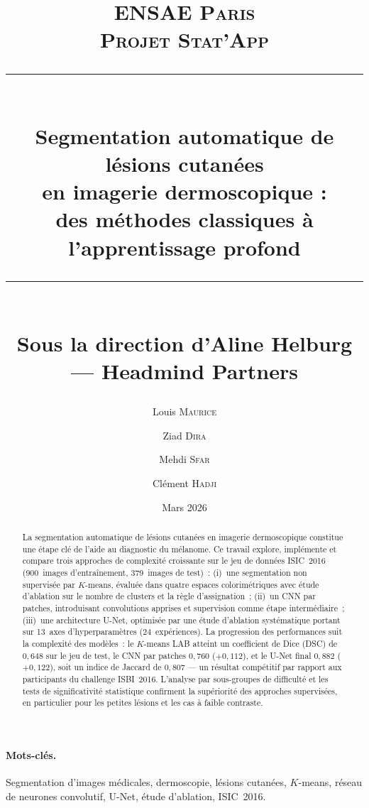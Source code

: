 \documentclass[12pt,a4paper]{article}
\title{%
    \vspace{-1cm}
    \textsc{ENSAE Paris} \\[0.3cm]
    \textsc{Projet Stat'App} \\[0.8cm]
    \rule{\linewidth}{0.5mm} \\[0.4cm]
    {\LARGE \textbf{Segmentation automatique de lésions cutanées \\[0.2cm]
    en imagerie dermoscopique : \\[0.2cm]
    des méthodes classiques à l'apprentissage profond}} \\[0.3cm]
    \rule{\linewidth}{0.5mm} \\[0.6cm]
    {\large Sous la direction d'Aline Helburg --- Headmind Partners}
}
\author{
    Louis \textsc{Maurice} \and
    Ziad \textsc{Dira} \and
    Mehdi \textsc{Sfar} \and
    Clément \textsc{Hadji}
}
\date{Mars 2026}
\begin{document}
\maketitle
\thispagestyle{empty}
\newpage

\begin{abstract}
La segmentation automatique de lésions cutanées en imagerie dermoscopique constitue une étape clé de l'aide au diagnostic du mélanome. Ce travail explore, implémente et compare trois approches de complexité croissante sur le jeu de données ISIC~2016 (900~images d'entraînement, 379~images de test)~: (i)~une segmentation non supervisée par $K$-means, évaluée dans quatre espaces colorimétriques avec étude d'ablation sur le nombre de clusters et la règle d'assignation~; (ii)~un CNN par patches, introduisant convolutions apprises et supervision comme étape intermédiaire~; (iii)~une architecture U-Net, optimisée par une étude d'ablation systématique portant sur 13~axes d'hyperparamètres (24~expériences). La progression des performances suit la complexité des modèles~: le $K$-means LAB atteint un coefficient de Dice (DSC) de $0{,}648$ sur le jeu de test, le CNN par patches $0{,}760$ ($+0{,}112$), et le U-Net final $0{,}882$ ($+0{,}122$), soit un indice de Jaccard de $0{,}807$ --- un résultat compétitif par rapport aux participants du challenge ISBI~2016. L'analyse par sous-groupes de difficulté et les tests de significativité statistique confirment la supériorité des approches supervisées, en particulier pour les petites lésions et les cas à faible contraste.
\end{abstract}

\paragraph*{Mots-clés.} Segmentation d'images médicales, dermoscopie, lésions cutanées, $K$-means, réseau de neurones convolutif, U-Net, étude d'ablation, ISIC~2016.

\vspace{1cm}
\end{document}
